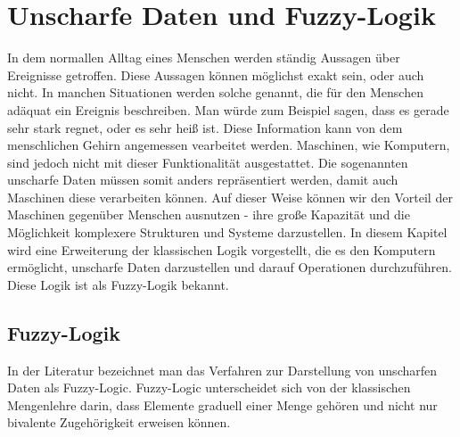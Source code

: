 \chapter{Unscharfe Daten und Fuzzy-Logik}
In dem normallen Alltag eines Menschen werden ständig Aussagen über Ereignisse getroffen. Diese Aussagen können möglichst exakt sein, oder auch nicht. In manchen Situationen werden solche genannt, die für den Menschen adäquat ein Ereignis beschreiben. Man würde zum Beispiel sagen, dass es gerade sehr stark regnet, oder es sehr heiß ist. Diese Information kann von dem menschlichen Gehirn angemessen vearbeitet werden. Maschinen, wie Komputern, sind jedoch nicht mit dieser Funktionalität ausgestattet. Die sogenannten unscharfe Daten müssen somit anders repräsentiert werden, damit auch Maschinen diese verarbeiten können. Auf dieser Weise können wir den Vorteil der Maschinen gegenüber Menschen ausnutzen - ihre große Kapazität und die Möglichkeit komplexere Strukturen und Systeme darzustellen. In diesem Kapitel wird eine Erweiterung der klassischen Logik vorgestellt, die es den Komputern ermöglicht, unscharfe Daten darzustellen und darauf Operationen durchzuführen. Diese Logik ist als Fuzzy-Logik bekannt.

\section{Fuzzy-Logik}


In der Literatur bezeichnet man das Verfahren zur Darstellung von unscharfen Daten als Fuzzy-Logic. Fuzzy-Logic unterscheidet sich von der klassischen Mengenlehre darin, dass Elemente graduell einer Menge gehören und nicht nur bivalente Zugehörigkeit erweisen können.

%

